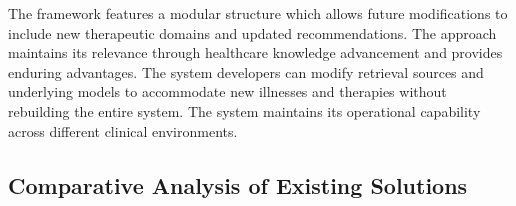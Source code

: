 \documentclass[preprint,12pt]{elsarticle}
\begin{document}
The framework features a modular structure which allows future modifications to include new therapeutic domains and updated recommendations. The approach maintains its relevance through healthcare knowledge advancement and provides enduring advantages. The system developers can modify retrieval sources and underlying models to accommodate new illnesses and therapies without rebuilding the entire system. The system maintains its operational capability across different clinical environments.


\subsection{Comparative Analysis of Existing Solutions}

\begin{table}[!ht]
\caption{Technical and Evaluation Comparison of Related Work and Our Agentic AI Pipeline}
\label{tab:comparison_full}
\centering
\renewcommand{\arraystretch}{1.5}
\setlength{\tabcolsep}{4pt}
\normalsize
{}
\end{table}
\end{document}
